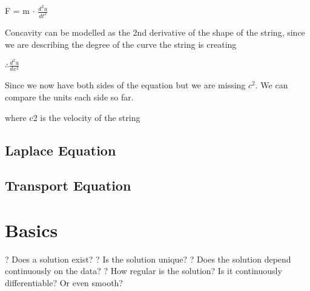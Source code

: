 \documentclass[10pt,a4paper]{report}
\begin{document}
F = m $\cdot$ $\frac{d^2u}{dt^2}$

Concavity can be modelled as the 2nd derivative of the shape of the string, since we are describing the degree of the curve the string is creating

$\therefore \frac{d^2u}{dx^2}$

Since we now have both sides of the equation but we are missing $c^2$. We can compare the units each side so far.

where c2 is the velocity of the string

\subsection{Laplace Equation}

\subsection{Transport Equation}

\section{Basics}
? Does a solution exist?
\newline
? Is the solution unique?
\newline
? Does the solution depend continuously on the data?
\newline
? How regular is the solution? Is it continuously differentiable? Or even
smooth?
\newline
\end{document}
